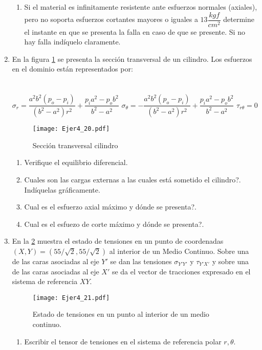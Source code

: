 \documentclass[../notas medios.tex]{subfiles}
\begin{document}
\begin{enumerate}
\begin{enumerate}
	\item Si el material es infinitamente resistente ante esfuerzos normales (axiales), pero no soporta esfuerzos cortantes mayores o iguales a $13\dfrac{kgf}{cm^2}$ determine el instante en que se presenta la falla en caso de que se presente. Si no hay falla ind\'iquelo claramente.
\end{enumerate}
\item \label{punto20} En la figura \ref{dona} se presenta la secci\'on
transversal de un cilindro. Los esfuerzos en el dominio est\'an representados por:\\\\
	\\
	$\sigma_{r} = \dfrac{a^2 b^2 (p_o-p_i)}{(b^2-a^2)r^2} + \dfrac{p_i a^2 - p_o b^2}{b^2-a^2}$ \hspace{10mm}
	$\sigma_{\theta} = -\dfrac{a^2 b^2 (p_o-p_i)}{(b^2-a^2)r^2} + \dfrac{p_i a^2 - p_o b^2}{b^2-a^2}$\hspace{10mm}
	$\tau_{r \theta} = 0$ 
	\begin{figure}[H]
		\centering
		\texttt{[image: Ejer4\_20.pdf]} 
		\caption{Secci\'on transversal cilindro}
		\label{dona}
	\end{figure}
	\begin{enumerate}
		\item Verifique el equilibrio diferencial.
		\item \textquestiondown Cuales son las cargas externas a las cuales est\'a sometido el cilindro?. Indíquelas gr\'aficamente.
		\item \textquestiondown Cual es el esfuerzo axial m\'aximo y d\'onde se presenta?.
		\item \textquestiondown Cual es el esfuezo de corte m\'aximo y d\'onde se presenta?.
	\end{enumerate}
%
\item \label{punto21} En la \cref{PtoPol} muestra el estado de tensiones en un punto de coordenadas $(X,Y) = (55/\sqrt{2},55/\sqrt{2})$  al interior de un Medio Continuo. Sobre una de las caras asociadas al eje $Y'$ se dan las tensiones $\sigma_{Y'Y'}$ y $\tau_{Y'X'}$ y sobre una de las caras asociadas al eje $X'$ se da el vector de tracciones expresado en el sistema de referencia $XY$.
%
\begin{figure}[H]
	\centering
	\texttt{[image: Ejer4\_21.pdf]} 
	\caption{Estado de tensiones en un punto al interior de un medio continuo.}
	\label{PtoPol}
\end{figure}
%
\begin{enumerate}
	\item Escribir el tensor de tensiones en el sistema de referencia polar $r,\theta$. \\
\end{enumerate}



\end{enumerate}
\end{document}
